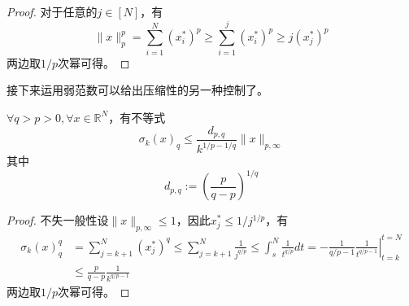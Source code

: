 \begin{proof}
    对于任意的$j \in [N]$，有
    \begin{equation}
        \|x\|_p^p=\sum_{i=1}^N\left(x_i^*\right)^p \geq \sum_{i=1}^j\left(x_i^*\right)^p \geq j\left(x_j^*\right)^p
    \end{equation}
    两边取$1/p$次幂可得。
\end{proof}
接下来运用弱范数可以给出压缩性的另一种控制了。
\begin{theorem}
    $\forall q>p>0,\forall x\in \mathbb{R}^N$，有不等式
    \begin{equation}
        \sigma_k(x)_q \leq \frac{d_{p,q}}{k^{1 / p-1 / q}}\|x\|_{p,\infty}
    \end{equation}
    其中
    \begin{equation}
        d_{p,q}:=\left(\frac{p}{q-p}\right)^{1 / q}
    \end{equation}
\end{theorem}
\begin{proof}
    不失一般性设$\|x\|_{p,\infty}\le 1$，因此$x^*_j\le 1/j^{1/p}$，有
    \begin{equation}
        \begin{aligned}
        \sigma_k(x)_q^q & =\sum_{j=k+1}^N\left(x_j^*\right)^q \leq \sum_{j=k+1}^N \frac{1}{j^{q / p}} \leq \int_s^N \frac{1}{t^{q / p}} d t=-\left.\frac{1}{q / p-1} \frac{1}{t^{q / p-1}}\right|_{t=k} ^{t=N} \\
        & \leq \frac{p}{q-p} \frac{1}{k^{q / p-1}} 
        \end{aligned}
        \end{equation}
        两边取$1/p$次幂可得。
\end{proof}

